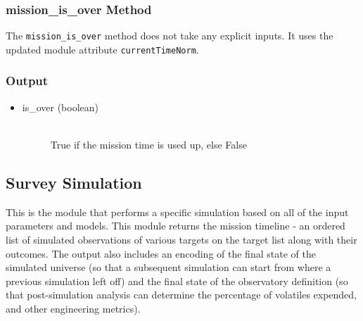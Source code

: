 \documentclass[cleanfoot]{asme2ej}
\begin{document}
\subsubsection{mission\_is\_over Method} \label{sec:missionisovertask}
The \verb+mission_is_over+ method does not take any explicit inputs.  It uses the updated module attribute \verb+currentTimeNorm+.

\subsubsection*{Output}
\begin{itemize}
\item 
\begin{description}
    \item[is\_over (boolean)] \hfill \\ True if the mission time is used up, else False
\end{description}
\end{itemize}



\subsection{Survey Simulation} \label{sec:surveysim}
This is the module that performs a specific simulation based on all of the input parameters and models. This module returns the mission timeline - an ordered list of simulated observations of various targets on the target list along with their outcomes.  The output also includes an encoding of the final state of the simulated universe (so that a subsequent simulation can start from where a previous simulation left off) and the final state of the observatory definition (so that post-simulation analysis can determine the percentage of volatiles expended, and other engineering metrics).
\end{document}
